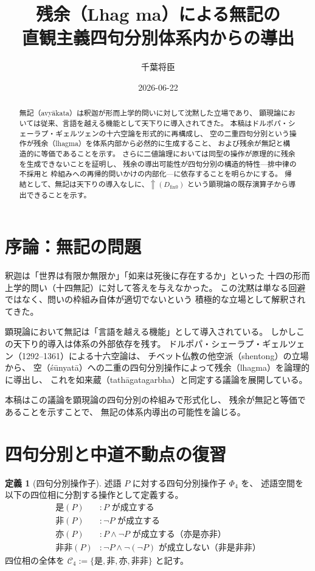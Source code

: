 \documentclass[11pt,a4paper]{article}
\title{残余（Lhag ma）による無記の\\
直観主義四句分別体系内からの導出}
\author{千葉将臣}
\date{2026-06-22}
\theoremstyle{definition}
\newtheorem{definition}{定義}[section]
\newcommand{\dfix}{D_{\mathrm{fix}0}}
\newcommand{\metanegation}{\Uparrow}
\newcommand{\phiS}{\text{是}}
\newcommand{\phiN}{\text{非}}
\newcommand{\phiSN}{\text{亦}}
\newcommand{\phiNS}{\text{非非}}
\newcommand{\Phifour}{\Phi_{4}}
\begin{document}
\maketitle

\begin{abstract}
無記（avyākata）は釈迦が形而上学的問いに対して沈黙した立場であり、
顕現論においては従来、言語を越える機能として天下りに導入されてきた。
本稿はドルポパ・シェーラプ・ギェルツェンの十六空論を形式的に再構成し、
空の二重四句分別という操作が残余（lhagma）を体系内部から必然的に生成すること、
および残余が無記と構造的に等価であることを示す。
さらに二値論理においては同型の操作が原理的に残余を生成できないことを証明し、
残余の導出可能性が四句分別の構造的特性---排中律の不採用と
枠組みへの再帰的問いかけの内部化---に依存することを明らかにする。
帰結として、無記は天下りの導入なしに、$\metanegation({\dfix})$
という顕現論の既存演算子から導出できることを示す。
\end{abstract}

\section{序論：無記の問題}

釈迦は「世界は有限か無限か」「如来は死後に存在するか」といった
十四の形而上学的問い（十四無記）に対して答えを与えなかった。
この沈黙は単なる回避ではなく、問いの枠組み自体が適切でないという
積極的な立場として解釈されてきた。

顕現論において無記は「言語を越える機能」として導入されている。
しかしこの天下り的導入は体系の外部依存を残す。
ドルポパ・シェーラプ・ギェルツェン（1292--1361）による十六空論は、
チベット仏教の他空派（shentong）の立場から、
空（śūnyatā）への二重の四句分別操作によって残余（lhagma）を論理的に導出し、
これを如来蔵（tathāgatagarbha）と同定する議論を展開している。

本稿はこの議論を顕現論の四句分別の枠組みで形式化し、
残余が無記と等価であることを示すことで、
無記の体系内導出の可能性を論じる。

\section{四句分別と中道不動点の復習}

\begin{definition}[四句分別操作子]
述語 $P$ に対する四句分別操作子 $\Phifour$ を、
述語空間を以下の四位相に分割する操作として定義する。
\begin{align}
\phiS(P) &: P \text{ が成立する}\\
\phiN(P) &: \neg P \text{ が成立する}\\
\phiSN(P) &: P \wedge \neg P \text{ が成立する（亦是亦非）}\\
\phiNS(P) &: \neg P \wedge \neg(\neg P) \text{ が成立しない（非是非非）}
\end{align}
四位相の全体を $\mathcal{C}_4 := \{\phiS, \phiN, \phiSN, \phiNS\}$ と記す。
\end{definition}
\end{document}
